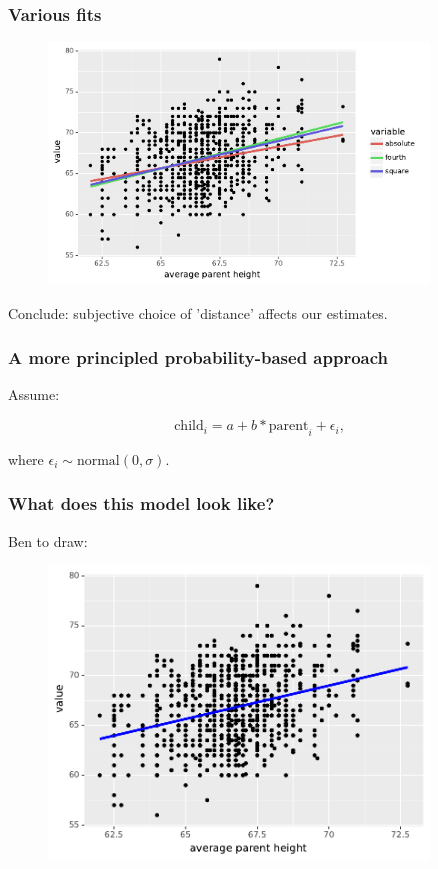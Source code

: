 \documentclass[handout]{beamer}
\begin{document}
\begin{frame}
	\frametitle{Various fits}
	
		\begin{figure}[ht]
			\centerline{\includegraphics[width=0.9\textwidth]{../figures/galton_fits_all.pdf}}
		\end{figure}
		
		Conclude: subjective choice of 'distance' affects our estimates.
	
\end{frame}

\begin{frame}
	\frametitle{A more principled probability-based approach}
	
	Assume:
	
	\begin{equation}
	\text{child}_i = a + b * \text{parent}_i + \epsilon_i,
	\end{equation}
	
	where $\epsilon_i \sim \text{normal}(0, \sigma)$.
	
\end{frame}

\begin{frame}
	\frametitle{What does this model look like?}
	
	Ben to draw:
	
	\begin{figure}[ht]
		\centerline{\includegraphics[width=0.9\textwidth]{../figures/galton_fit_sse.pdf}}
	\end{figure}
	
\end{frame}
\end{document}
